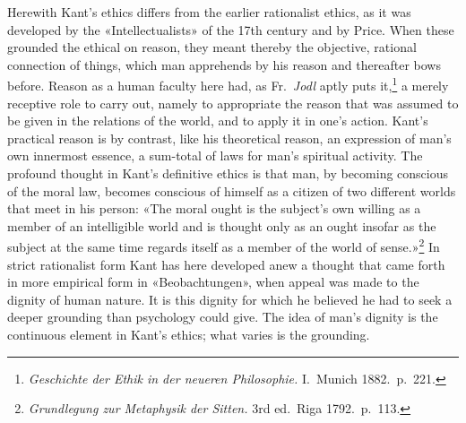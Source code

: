 \documentclass[12pt,a4paper]{article}
\newcommand{\opage}[1]{\marginnote{\footnotesize\textit{[#1]}}}
\begin{document}
Herewith Kant's ethics differs from the earlier rationalist ethics, as it
was developed by the «Intellectualists» of the 17th century and by Price.
When these grounded the ethical on reason, they meant thereby the objective,
rational \opage{46}connection of things, which man apprehends by his reason and
thereafter bows before. Reason as a human faculty here had, as Fr.\ \emph{Jodl}
aptly puts it,\footnote{\textit{Geschichte der Ethik in der neueren
Philosophie.} I.\ Munich 1882.\ p.\ 221.} a merely receptive role to carry
out, namely to appropriate the reason that was assumed to be given in the
relations of the world, and to apply it in one's action. Kant's practical
reason is by contrast, like his theoretical reason, an expression of man's
own innermost essence, a sum-total of laws for man's spiritual activity. The
profound thought in Kant's definitive ethics is that man, by becoming
conscious of the moral law, becomes conscious of himself as a citizen of two
different worlds that meet in his person: «The moral ought is the subject's
own willing as a member of an intelligible world and is thought only as an
ought insofar as the subject at the same time regards itself as a member of
the world of sense.»\footnote{\textit{Grundlegung zur Metaphysik der
Sitten.} 3rd ed.\ Riga 1792.\ p.\ 113.} In strict rationalist form Kant has
here developed anew a thought that came forth in more empirical form in
«Beobachtungen», when appeal was made to the dignity of human nature. It is
this dignity for which he believed he had to seek a deeper grounding than
psychology could give. The idea of man's dignity is the continuous element
in Kant's ethics; what varies is the grounding.
\end{document}
